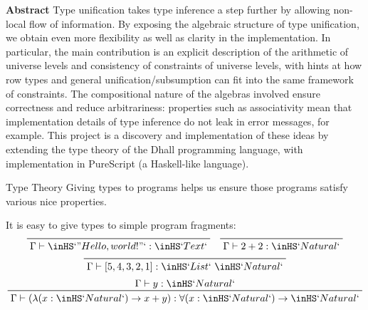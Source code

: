 \documentclass[12pt]{article}
\begin{document}
\begin{posterbard}



\begin{posterbox}{\textbf{Abstract}}
Type unification takes type inference a step further by allowing non-local flow of information.
By exposing the algebraic structure of type unification, we obtain even more flexibility as well as clarity in the implementation.
In particular, the main contribution is an explicit description of the arithmetic of universe levels and consistency of constraints of universe levels, with hints at how row types and general unification/subsumption can fit into the same framework of constraints.
The compositional nature of the algebras involved ensure correctness and reduce arbitrariness: properties such as associativity mean that implementation details of type inference do not leak in error messages, for example.
This project is a discovery and implementation of these ideas by extending the type theory of the Dhall programming language, with implementation in PureScript (a Haskell-like language).
\end{posterbox}

\begin{posterbox}{Type Theory}
Giving types to programs helps us ensure those programs satisfy various nice properties.

It is easy to give types to simple program fragments:
\vspace{0.2em}
\begin{displaymath}
\prftree{\Gamma \vdash \inHS`"Hello, world!" ` : \inHS`Text`}
\quad
\prftree{\Gamma \vdash 2 + 2 : \inHS`Natural`}
\end{displaymath}
\begin{displaymath}
\prftree{\Gamma \vdash [5,4,3,2,1] : \inHS`List`\ \inHS`Natural`}
\end{displaymath}
\vspace{0.05em}
\begin{displaymath}
\prftree{\Gamma \vdash y : \inHS`Natural`}{\Gamma \vdash (\lambda(x : \inHS`Natural`) \to x + y) : \forall(x : \inHS`Natural`) \to \inHS`Natural`}
\end{displaymath}
\vspace{0.05em}


\end{posterbox}
\end{posterbard}
\end{document}
